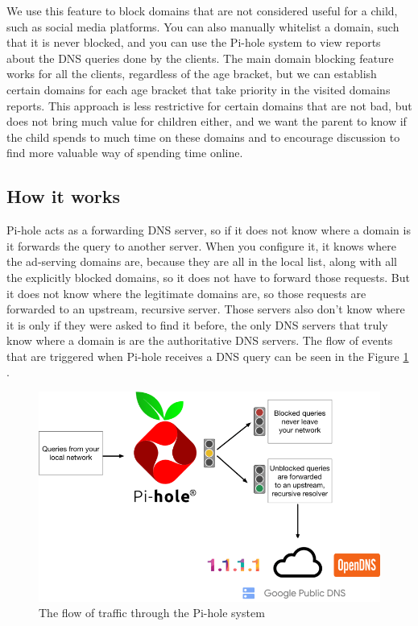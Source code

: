 We use this feature to block domains that are not considered useful for a child, such as social media platforms. You can also manually whitelist a domain, such that it is never blocked, and you can use the Pi-hole system to view reports about the DNS queries done by the clients. The main domain blocking feature works for all the clients, regardless of the age bracket, but we can establish certain domains for each age bracket that take priority in the visited domains reports. This approach is less restrictive for certain domains that are not bad, but does not bring much value for children either, and we want the parent to know if the child spends to much time on these domains and to encourage discussion to find more valuable way of spending time online.

\subsection{How it works}

Pi-hole acts as a forwarding DNS server, so if it does not know where a domain is it forwards the query to another server. When you configure it, it knows where the ad-serving domains are, because they are all in the local list, along with all the explicitly blocked domains, so it does not have to forward those requests. But it does not know where the legitimate domains are, so those requests are forwarded to an upstream, recursive server. Those servers also don't know where it is only if they were asked to find it before, the only DNS servers that truly know where a domain is are the authoritative DNS servers. The flow of events that are triggered when Pi-hole receives a DNS query can be seen in the Figure \ref{fig:pihole-dns} \citep{salmela2017ftldns}.

\begin{figure}[th]
\centering
\includegraphics[width=1\textwidth]{Figures/pihole-dns}
\decoRule
\caption{The flow of traffic through the Pi-hole system}
\label{fig:pihole-dns}
\end{figure}

